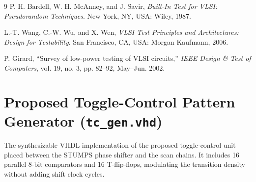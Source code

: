\documentclass[conference]{IEEEtran}
\begin{document}
\begin{thebibliography}{9}
P. H. Bardell, W. H. McAnney, and J. Savir, \emph{Built-In Test for VLSI: Pseudorandom Techniques}. New York, NY, USA: Wiley, 1987.

L.-T. Wang, C.-W. Wu, and X. Wen, \emph{VLSI Test Principles and Architectures: Design for Testability}. San Francisco, CA, USA: Morgan Kaufmann, 2006.

P. Girard, ``Survey of low-power testing of VLSI circuits,'' \emph{IEEE Design \& Test of Computers}, vol. 19, no. 3, pp. 82--92, May--Jun. 2002.
\end{thebibliography}

\appendices

\section{Proposed Toggle-Control Pattern Generator (\texttt{tc\_gen.vhd})}
\label{app:tc_gen}
The synthesizable VHDL implementation of the proposed toggle-control unit placed between the STUMPS phase shifter and the scan chains. It includes 16 parallel 8-bit comparators and 16 T-flip-flops, modulating the transition density without adding shift clock cycles.
\end{document}
